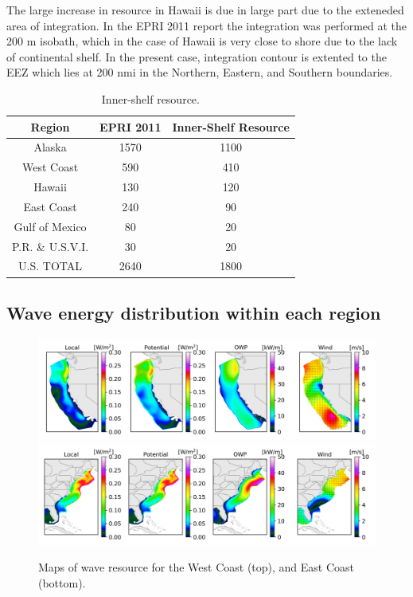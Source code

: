 The large increase in resource in Hawaii is due in large part due to the exteneded area of integration. In the EPRI 2011 report the integration was performed at the 200 m isobath, which in the case of Hawaii is very close to shore due to the lack of continental shelf. In the present case, integration contour is extented to the EEZ which lies at 200 nmi in the Northern, Eastern, and Southern boundaries.

\begin{table}[ht]
  \centering
  \begin{tabular}{|c|c|c|}
    \hline
    Region & EPRI 2011 &Inner-Shelf Resource \\
    \hline
    Alaska & 1570 &1100 \\
    West Coast & 590 & 410 \\
    Hawaii & 130 & 120 \\
    East Coast & 240 & 90 \\
    Gulf of Mexico & 80 & 20 \\
    P.R. \& U.S.V.I. & 30 & 20 \\
    \hline \hline
    U.S. TOTAL & 2640 & 1800 \\
    \hline
  \end{tabular}
  \caption{Inner-shelf resource. }
  \label{tab:nearshore-total}
\end{table}

\subsection{Wave energy distribution within each region}

\begin{figure}[ht]
  \centering
  \includegraphics[width=\textwidth]{../fig/WC-Map01-November.png}
  \includegraphics[width=\textwidth]{../fig/EC-Map01-November.png}
  \caption{Maps of wave resource for the West Coast (top), and East Coast (bottom). }
  \label{fig:maps}
\end{figure}

